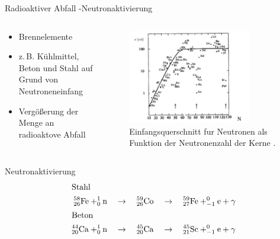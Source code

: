 \begin{frame}{Radioaktiver Abfall -Neutronaktivierung}
  \begin{columns}

    \begin{column}{0.48\textwidth}
      \begin{itemize}
        \setlength\itemsep{1.2em}
        \item{Brennelemente}
        \item{z.\,B. Kühlmittel, Beton und Stahl auf Grund von Neutroneneinfang}
        \item{ Vergößerung der Menge an radioaktove Abfall}
      \end{itemize}
    \end{column}

    \begin{column}{0.48\textwidth}
        \begin{figure}
           \centering
           \includegraphics[width=0.8\textwidth]{./bilder/einfangwahrscheinlichkeit_neutron.png}
           \caption{Einfangsquerschnitt fur Neutronen als Funktion der Neutronenzahl der Kerne \cite{neutroneneinfang}. }
           \label{ fig: abbau_roboter}
         \end{figure}
    \end{column}

  \end{columns}
\end{frame}



\begin{frame}{Neutronaktivierung}
  \begin{align*}
    \shortintertext{Stahl}
    ^{58}_{26}\ce{Fe}+ ^1_0\mathrm{n }\quad &\rightarrow \quad  ^{59}_{26}\ce{Co} \quad \rightarrow \quad ^{59}_{27}\ce{Fe} + _{-1}^{0}\ce{e}+\gamma \\
  \shortintertext{Beton}
    ^{44}_{20}\ce{Ca}+ ^1_0\mathrm{n }\quad &\rightarrow \quad  ^{45}_{20}\ce{Ca} \quad \rightarrow \quad ^{45}_{21}\ce{Sc} + _{-1}^{0}\ce{e}+\gamma
  \end{align*}
\end{frame}





